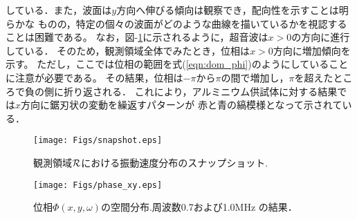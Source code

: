 している．また，波面は$y$方向へ伸びる傾向は観察でき，配向性を示すことは明らかな
ものの，特定の個々の波面がどのような曲線を描いているかを視認することは困難である。
なお，図-\ref{fig:fig4}に示されるように，超音波は$x>0$の方向に進行している．
そのため，観測領域全体でみたとき，位相は$x>0$方向に増加傾向を示す。
ただし，ここでは位相の範囲を式(\ref{eqn:dom_phi})のようにしていることに注意が必要である。
その結果，位相は$-\pi$から$\pi$の間で増加し，$\pi$を超えたところで負の側に折り返される．
これにより，アルミニウム供試体に対する結果では$x$方向に鋸刃状の変動を繰返すパターンが
赤と青の縞模様となって示されている．
\begin{figure}
\begin{center}
	\texttt{[image: Figs/snapshot.eps]}
\caption{
	観測領域${\cal R}$における振動速度分布のスナップショット.
}
\label{fig:fig4}
\end{center}
\end{figure}
\begin{figure}
\begin{center}
	\texttt{[image: Figs/phase\_xy.eps]}
	\caption{位相$\Phi(x,y,\omega)$の空間分布.周波数0.7および1.0MHz
	の結果．}
	\label{fig:fig5}
\end{center}
\end{figure}
